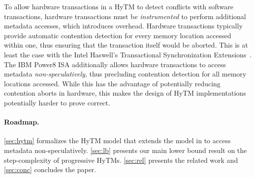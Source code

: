 To allow hardware transactions in a HyTM to detect conflicts with software transactions, 
hardware transactions must be \emph{instrumented} to perform additional metadata accesses, which introduces overhead.
Hardware transactions typically provide automatic contention detection for every memory location accessed within one,
thus ensuring that the transaction itself would be aborted.
This is at least the case with the Intel Haswell's Transactional Synchronization Extensions~\cite{haswell}.
The IBM Power8 ISA additionally allows hardware transactions to access metadata \emph{non-speculatively}, thus precluding
contention detection for all memory locations accessed. While this has the advantage of potentially reducing contention aborts
in hardware, this makes the design of HyTM implementations potentially harder to prove correct.

\paragraph{Roadmap.}
\cref{sec:hytm} formalizes the HyTM model that extends the model in \cite{htmdisc15} 
to access metadata non-speculatively.
\cref{sec:lb} presents our main lower bound result on the step-complexity of progressive HyTMs.
\cref{sec:rel} presents the related work and \cref{sec:conc} concludes the paper.
%